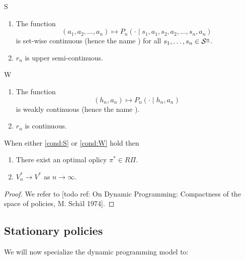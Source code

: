 \documentclass{article}
\begin{document}
\begin{cond}{S}
  \begin{enumerate}
    \item The function \[
	(a_1, a_2, \dots, a_n) \mapsto
	P_n(\cdot \mid s_1, a_1, s_2, a_2, \dots, s_n, a_n)
      \]
      is set-wise continuous (hence the name )
      for all $s_1, \dots, s_n \in \mathcal{S}^{\underline{n}}$.
    \item $r_n$ is upper semi-continuous.
  \end{enumerate}
  \label{cond:S}
\end{cond}

\begin{cond}{W}
  \begin{enumerate}
    \item The function
      \[(h_n, a_n) \mapsto P_n(\cdot \mid h_n, a_n)\]
	is weakly continuous (hence the name ).
    \item $r_n$ is continuous.
  \end{enumerate}
  \label{cond:W}
\end{cond}

\begin{thm}
  When either \cref{cond:S} or \cref{cond:W} hold then
  \begin{enumerate}
    \item There exist an optimal oplicy $\pi^* \in R\Pi$.
    \item $V^*_n \to V^*$ as $n \to \infty$.
  \end{enumerate}
\end{thm}
\begin{proof}
  We refer to [todo ref: On Dynamic Programming: Compactness of the space of
  policies, M. Schäl 1974]. %
\end{proof}

\subsection{Stationary policies}

We will now specialize the dynamic programming model to:
\end{document}
